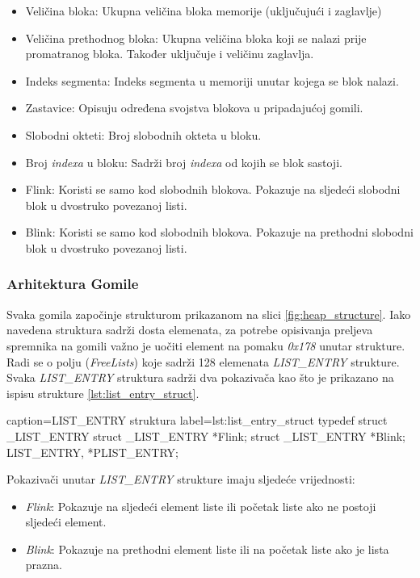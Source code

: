 \documentclass[times, utf8, diplomski, numeric]{fer}
\begin{document}
\begin{itemize}
\item Veličina bloka: Ukupna veličina bloka memorije (uključujući i zaglavlje)
\item Veličina prethodnog bloka: Ukupna veličina bloka koji se nalazi prije promatranog bloka. Također uključuje i veličinu zaglavlja.
\item Indeks segmenta: Indeks segmenta u memoriji unutar kojega se blok nalazi.
\item Zastavice: Opisuju određena svojstva blokova u pripadajućoj gomili.
\item Slobodni okteti: Broj slobodnih okteta u bloku.
\item Broj \emph{indexa} u bloku: Sadrži broj \emph{indexa} od kojih se blok sastoji. 
\item Flink: Koristi se samo kod slobodnih blokova. Pokazuje na sljedeći slobodni blok u dvostruko povezanoj listi.
\item Blink: Koristi se samo kod slobodnih blokova. Pokazuje na prethodni slobodni blok u dvostruko povezanoj listi.
\end{itemize}

\subsubsection{Arhitektura Gomile}

Svaka gomila započinje strukturom prikazanom na slici 
\ref{fig:heap_structure}. Iako navedena struktura sadrži dosta
elemenata, za potrebe opisivanja preljeva spremnika na gomili
važno je uočiti element na pomaku \emph{0x178} unutar strukture.
Radi se o polju (\emph{FreeLists}) koje sadrži 128 elemenata
\emph{LIST\_ENTRY} strukture. Svaka \emph{LIST\_ENTRY} struktura
sadrži dva pokazivača kao što je prikazano na ispisu strukture 
\ref{lst:list_entry_struct}.

\begin{struktura} {caption=LIST\_ENTRY struktura} {label=lst:list_entry_struct}
typedef struct _LIST_ENTRY {
  struct _LIST_ENTRY  *Flink;
  struct _LIST_ENTRY  *Blink;
} LIST_ENTRY, *PLIST_ENTRY;
\end{struktura}

Pokazivači unutar \emph{LIST\_ENTRY} strukture imaju sljedeće vrijednosti:

\begin{itemize}
\item \emph{Flink}: Pokazuje na sljedeći element liste ili početak liste ako ne postoji sljedeći element.
\item \emph{Blink}: Pokazuje na prethodni element liste ili na početak liste ako je lista prazna.
\end{itemize}
\end{document}
